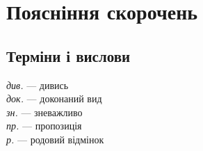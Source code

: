 \clearpage

\onecolumn
\section{Поясніння скорочень}
\subsection{Терміни і вислови}
\textit{див.} — дивись\\
\textit{док.} — доконаний вид\\
\textit{зн.} — зневажливо\\
\textit{пр.} — пропозиція\\
\textit{р.} — родовий відмінок

\thispagestyle{empty}



